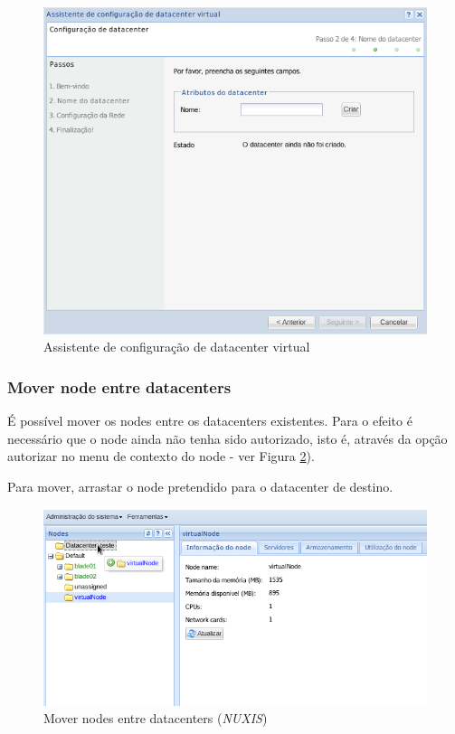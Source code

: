 {\begin{figure}[H]
        \begin{center}
        \includegraphics[scale=0.7]{screenshots/cluster_config.png}
        \caption{Assistente de configuração de datacenter virtual}
        \label{fig:cluster_config}
        \end{center}
\end{figure}

\subsubsection{Mover node entre datacenters}
É possível mover os nodes entre os datacenters existentes. Para o efeito é necessário que o node ainda não tenha sido autorizado, isto é, através da opção autorizar no menu de contexto do node - ver Figura \ref{fig:cluster-move}).

Para mover, arrastar o node pretendido para o datacenter de destino.

\begin{figure}[H]
        \begin{center}
        \includegraphics[scale=0.7]{screenshots/cluster-move.png}
        \caption{Mover nodes entre datacenters (\emph{NUXIS})}
        \label{fig:cluster-move}
        \end{center}
\end{figure}

}
